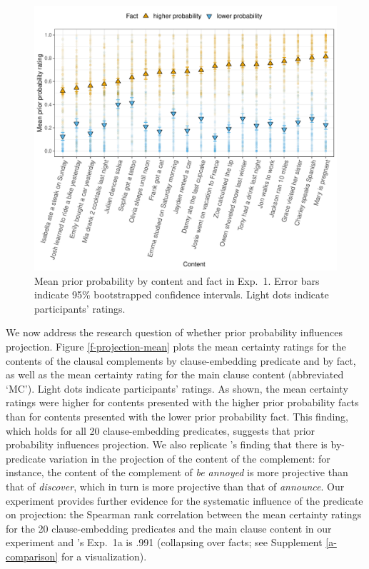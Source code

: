 \documentclass[11pt,fleqn]{article}
\newcommand{\6}{\mbox{$[\hspace*{-.6mm}[$}}
\newcommand{\9}{\mbox{$]\hspace*{-.6mm}]$}}
\newcommand{\citepos}[1]{\citeauthor{#1}'s \citeyear{#1}}
\begin{document}
\begin{figure}[h!]
\centering
\includegraphics[width=.75\paperwidth]{../../results/exp4/graphs/prior-ratings}

\caption{Mean prior probability by content and fact in Exp.~1. Error bars indicate 95\% bootstrapped confidence intervals. Light dots indicate participants' ratings.} 
\label{f-prior}
\end{figure}

We now address the research question of whether prior probability influences projection. Figure \ref{f-projection-mean} plots the mean certainty ratings for the contents of the clausal complements by clause-embedding predicate and by fact, as well as the mean certainty rating for the main clause content (abbreviated `MC'). Light dots indicate participants' ratings. As shown, the mean certainty ratings were higher for contents  presented with the higher prior probability facts than for contents presented with the lower prior probability fact. This finding, which holds for all 20 clause-embedding predicates, suggests that prior probability influences projection. We also replicate \citepos{tonhauser-degen-factive} finding that there is by-predicate variation in the projection of the content of the complement: for instance, the content of the complement of {\em be annoyed} is more projective than that of {\em discover}, which in turn is more projective than that of {\em announce}. Our experiment provides further evidence for the systematic influence of the predicate on projection: the Spearman rank correlation between the mean certainty ratings for the 20 clause-embedding predicates and the main clause content in our experiment and \citepos{tonhauser-degen-factive} Exp.~1a is .991 (collapsing over facts; see Supplement \ref{a-comparison} for a visualization).
\end{document}
